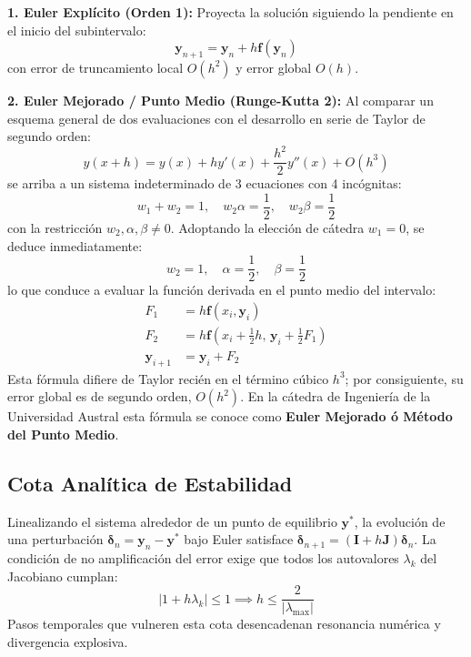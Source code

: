 \documentclass[10pt,twocolumn,a4paper]{article}
\begin{document}
\textbf{1. Euler Explícito (Orden 1):} Proyecta la solución siguiendo la pendiente en el inicio del subintervalo:
\begin{equation}
  \mathbf{y}_{n+1} = \mathbf{y}_n + h \mathbf{f}(\mathbf{y}_n)
\end{equation}
con error de truncamiento local $O(h^2)$ y error global $O(h)$.

\textbf{2. Euler Mejorado / Punto Medio (Runge-Kutta 2):}
Al comparar un esquema general de dos evaluaciones con el desarrollo en serie de Taylor de segundo orden:
\begin{equation}
  y(x+h) = y(x) + h y'(x) + \frac{h^2}{2} y''(x) + O(h^3)
\end{equation}
se arriba a un sistema indeterminado de 3 ecuaciones con 4 incógnitas:
\begin{equation}
  w_1 + w_2 = 1, \quad w_2 \alpha = \frac{1}{2}, \quad w_2 \beta = \frac{1}{2}
\end{equation}
con la restricción $w_2, \alpha, \beta \ne 0$. Adoptando la elección de cátedra $w_1 = 0$, se deduce inmediatamente:
\begin{equation}
  w_2 = 1, \quad \alpha = \frac{1}{2}, \quad \beta = \frac{1}{2}
\end{equation}
lo que conduce a evaluar la función derivada en el punto medio del intervalo:
\begin{align}
  F_1 &= h \mathbf{f}(x_i, \mathbf{y}_i) \\
  F_2 &= h \mathbf{f}\left(x_i + \frac{1}{2}h, \, \mathbf{y}_i + \frac{1}{2} F_1\right) \\
  \mathbf{y}_{i+1} &= \mathbf{y}_i + F_2
\end{align}
Esta fórmula difiere de Taylor recién en el término cúbico $h^3$; por consiguiente, su error global es de segundo orden, $O(h^2)$. En la cátedra de Ingeniería de la Universidad Austral esta fórmula se conoce como \textbf{Euler Mejorado ó Método del Punto Medio}.

\subsection{Cota Analítica de Estabilidad}
Linealizando el sistema alrededor de un punto de equilibrio $\mathbf{y}^*$, la evolución de una perturbación $\boldsymbol{\delta}_n = \mathbf{y}_n - \mathbf{y}^*$ bajo Euler satisface $\boldsymbol{\delta}_{n+1} = (\mathbf{I} + h \mathbf{J}) \boldsymbol{\delta}_n$. La condición de no amplificación del error exige que todos los autovalores $\lambda_k$ del Jacobiano cumplan:
\begin{equation}
  |1 + h \lambda_k| \le 1 \implies h \le \frac{2}{|\lambda_{\max}|}
\end{equation}
Pasos temporales que vulneren esta cota desencadenan resonancia numérica y divergencia explosiva.
\end{document}
